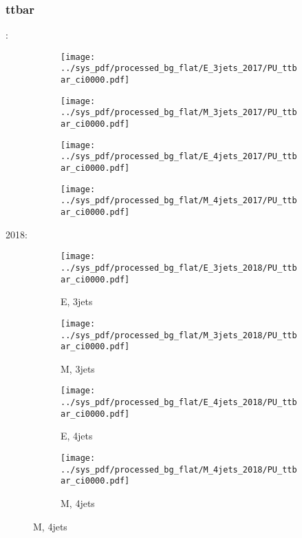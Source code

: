 \documentclass{beamer}
\begin{document}
\begin{frame}
\frametitle{ttbar}
\fontsize{5}{1}:
\begin{figure}
\centering
\begin{subfigure}[b]{0.24\textwidth}
\texttt{[image: ../sys\_pdf/processed\_bg\_flat/E\_3jets\_2017/PU\_ttbar\_ci0000.pdf]}
\end{subfigure}
\begin{subfigure}[b]{0.24\textwidth}
\texttt{[image: ../sys\_pdf/processed\_bg\_flat/M\_3jets\_2017/PU\_ttbar\_ci0000.pdf]}
\end{subfigure}
\begin{subfigure}[b]{0.24\textwidth}
\texttt{[image: ../sys\_pdf/processed\_bg\_flat/E\_4jets\_2017/PU\_ttbar\_ci0000.pdf]}
\end{subfigure}
\begin{subfigure}[b]{0.24\textwidth}
\texttt{[image: ../sys\_pdf/processed\_bg\_flat/M\_4jets\_2017/PU\_ttbar\_ci0000.pdf]}
\end{subfigure}
\end{figure}
2018:
\begin{figure}
\centering
\begin{subfigure}[b]{0.24\textwidth}
\texttt{[image: ../sys\_pdf/processed\_bg\_flat/E\_3jets\_2018/PU\_ttbar\_ci0000.pdf]}
\captionsetup{font=tiny}
\caption{E, 3jets}
\end{subfigure}
\begin{subfigure}[b]{0.24\textwidth}
\texttt{[image: ../sys\_pdf/processed\_bg\_flat/M\_3jets\_2018/PU\_ttbar\_ci0000.pdf]}
\captionsetup{font=tiny}
\caption{M, 3jets}
\end{subfigure}
\begin{subfigure}[b]{0.24\textwidth}
\texttt{[image: ../sys\_pdf/processed\_bg\_flat/E\_4jets\_2018/PU\_ttbar\_ci0000.pdf]}
\captionsetup{font=tiny}
\caption{E, 4jets}
\end{subfigure}
\begin{subfigure}[b]{0.24\textwidth}
\texttt{[image: ../sys\_pdf/processed\_bg\_flat/M\_4jets\_2018/PU\_ttbar\_ci0000.pdf]}
\captionsetup{font=tiny}
\caption{M, 4jets}
\end{subfigure}
\end{figure}
\end{frame}
\end{document}
